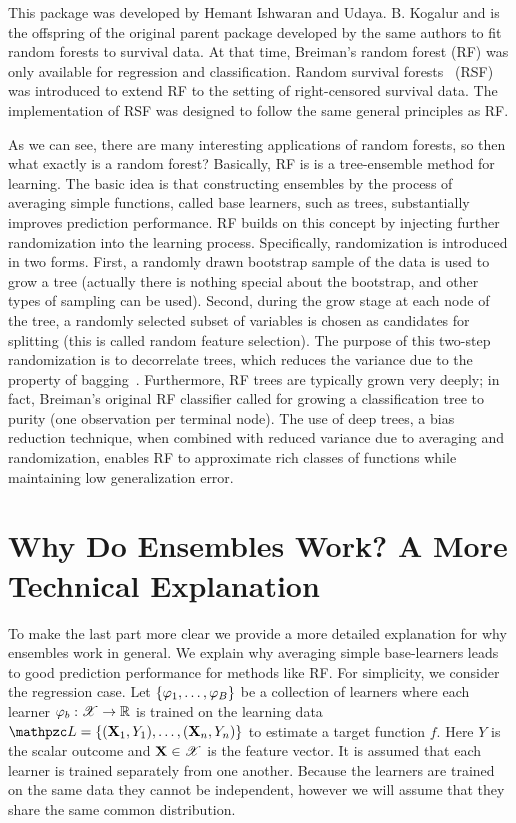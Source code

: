 \documentclass[twoside,11pt,english]{article}
\begin{document}
This package was developed by Hemant Ishwaran and Udaya. B. Kogalur and is the
offspring of the original parent package 
developed by the same authors to fit random forests to survival data.
At that time, Breiman's random forest (RF) was only
available for regression and classification.  Random survival
forests~\citep{Ishwaran2008} (RSF) was introduced to extend RF to the
setting of right-censored survival data. The implementation of RSF was
designed to follow the same general principles as RF.

As we can see, there are many interesting applications of random
forests, so then what exactly is a random forest?  Basically, RF is is
a tree-ensemble method for learning.  The basic idea is that
constructing ensembles by the process of averaging simple functions,
called base learners, such as trees, substantially improves prediction
performance.  RF builds on this concept by injecting further
randomization into the learning process.  Specifically, randomization
is introduced in two forms. First, a randomly drawn bootstrap sample
of the data is used to grow a tree (actually there is nothing special
about the bootstrap, and other types of sampling can be used).
Second, during the grow stage at each node of the tree, a randomly
selected subset of variables is chosen as candidates for splitting
(this is called random feature selection).  The purpose of this
two-step randomization is to decorrelate trees, which reduces the
variance due to the property of bagging~\citep{Breiman1996}.
Furthermore, RF trees are typically grown very deeply; in fact,
Breiman's original RF classifier called for growing a classification
tree to purity (one observation per terminal node).  The use of deep
trees, a bias reduction technique, when combined with reduced variance
due to averaging and randomization, enables RF to approximate rich
classes of functions while maintaining low generalization error.


\section*{Why Do Ensembles Work?  A More Technical Explanation}

To make the last part more clear we provide a more detailed
explanation for why ensembles work in general.  We explain why
averaging simple base-learners leads to good prediction performance
for methods like RF.  For simplicity, we consider the regression case.
Let $\{\varphi_1,\ldots,\varphi_B\}$ be a collection of learners where each
learner $\varphi_b:{\mathscr X}\rightarrow\mathbb{R}$ is trained on the learning data
$\LL=\{(\X_1,Y_1), \ldots, (\X_n,Y_n)\}$ to estimate a target
function $f$.  Here  $Y$ is the scalar outcome and ${\bf X}\in{\mathscr X}$ is the
feature vector.  It is assumed that each learner is trained separately
from one another.  Because the learners are trained on the same data
they cannot be independent, however we will assume that they share the
same common distribution.
\end{document}
